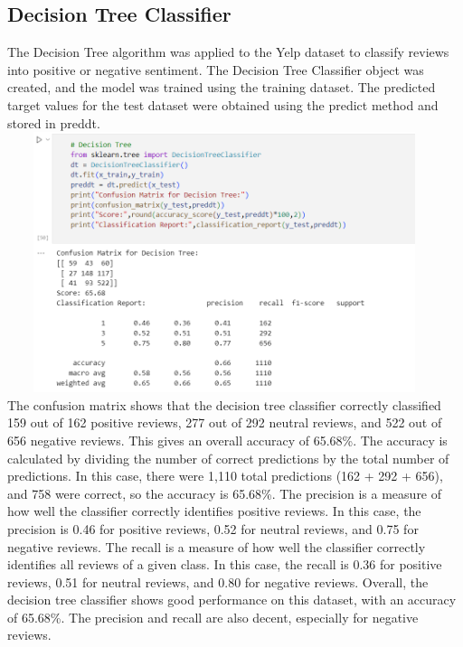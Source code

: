 \documentclass[a4paper, 12pt]{report}
\begin{document}
\subsection{Decision Tree Classifier }
The Decision Tree algorithm was applied to the Yelp dataset to classify reviews into positive or negative sentiment. The Decision Tree Classifier object was created, and the model was trained using the training dataset. The predicted target values for the test dataset were obtained using the predict method and stored in preddt.\\
\includegraphics[height=3in,width=5in]{17}\\
The confusion matrix shows that the decision tree classifier correctly classified 159 out of 162 positive reviews, 277 out of 292 neutral reviews, and 522 out of 656 negative reviews. This gives an overall accuracy of 65.68\%.
The accuracy is calculated by dividing the number of correct predictions by the total number of predictions. In this case, there were 1,110 total predictions (162 + 292 + 656), and 758 were correct, so the accuracy is 65.68\%.
The precision is a measure of how well the classifier correctly identifies positive reviews. In this case, the precision is 0.46 for positive reviews, 0.52 for neutral reviews, and 0.75 for negative reviews.
The recall is a measure of how well the classifier correctly identifies all reviews of a given class. In this case, the recall is 0.36 for positive reviews, 0.51 for neutral reviews, and 0.80 for negative reviews.
Overall, the decision tree classifier shows good performance on this dataset, with an accuracy of 65.68\%. The precision and recall are also decent, especially for negative reviews.
\pagebreak
\end{document}
